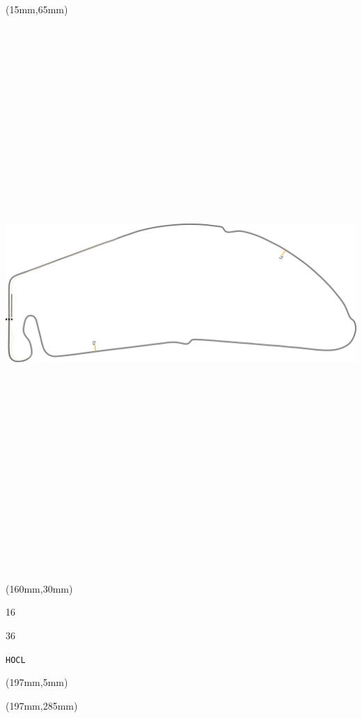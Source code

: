 \begin{textblock*}{185mm}(15mm,65mm)%
\centering
\mbox{\includegraphics[width=185mm,height=210mm,keepaspectratio]{PT/HOCL.pdf}}
\end{textblock*}
\begin{textblock*}{40mm}(160mm,30mm)%
\Large
\par{} 
\par16 
\par36 
\par\hfill\tiny\tt HOCL\\
\end{textblock*}
\begin{textblock*}{20mm}(197mm,5mm)%
\fbox{\thepage}
\label{HOCL}
\end{textblock*}
\begin{textblock*}{20mm}(197mm,285mm)%
\fbox{\thepage}
\end{textblock*}

